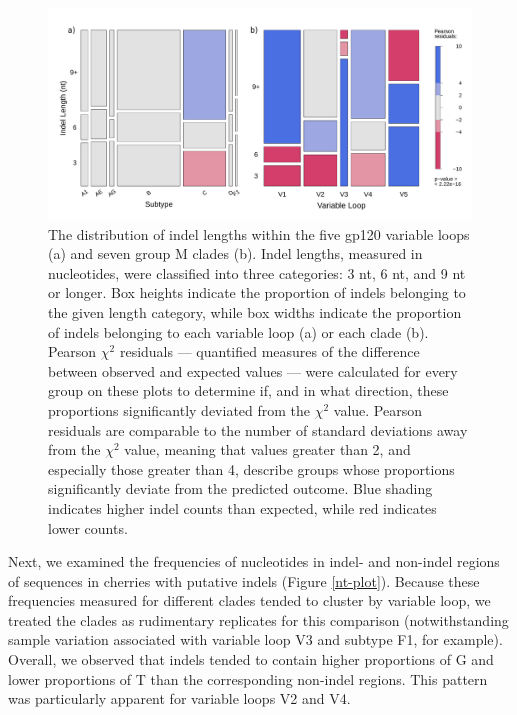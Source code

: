 \documentclass[12pt]{article}
\begin{document}
\begin{figure}[htbp]
    \centering
    \includegraphics[scale=0.37, trim={12mm 5mm 0 5mm},clip]{mosaic-combined.pdf}
    \caption{
    The distribution of indel lengths within the five gp120 variable loops (a) and seven group M clades (b). 
    Indel lengths, measured in nucleotides, were classified into three categories: 3 nt, 6 nt, and 9 nt or longer. 
    Box heights indicate the proportion of indels belonging to the given length category, while box widths indicate the proportion of indels belonging to each variable loop (a) or each clade (b).  
    Pearson $\chi^2$ residuals --- quantified measures of the difference between observed and expected values --- were calculated for every group on these plots to determine if, and in what direction, these proportions significantly deviated from the $\chi^2$ value. 
    Pearson residuals are comparable to the number of standard deviations away from the $\chi^2$ value, meaning that values greater than 2, and especially those greater than 4, describe groups whose proportions significantly deviate from the predicted outcome.
    Blue shading indicates higher indel counts than expected, while red indicates lower counts.
    }
    \label{mosaic}
\end{figure}



Next, we examined the frequencies of nucleotides in indel- and non-indel regions of sequences in cherries with putative indels (Figure \ref{nt-plot}).  
Because these frequencies measured for different clades tended to cluster by variable loop, we treated the clades as rudimentary replicates for this comparison (notwithstanding sample variation associated with variable loop V3 and subtype F1, for example).
Overall, we observed that indels tended to contain higher proportions of G and lower proportions of T than the corresponding non-indel regions.
This pattern was particularly apparent for variable loops V2 and V4.
\end{document}

